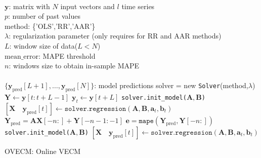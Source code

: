 \begin{algorithm}[ht]
\begin{algorithmic}[1]
\REQUIRE $\,$ \\
$\mathbf{y}$: matrix with $N$ input vectors and $l$ time series\\
$p$: number of past values \\
method: \{'OLS','RR','AAR'\} \\
$\lambda$: regularization parameter (only requires for RR and AAR methods) \\
$L$: window size of data($L<N$) \\
$\text{mean\_error}$: MAPE threshold \\
$n$: windows size to obtain in-sample MAPE \\
\ENSURE  $\,$ \\
$\{\mathbf{y}_{\text{pred}}[L+1],\dots, \mathbf{y}_{\text{pred}}[N]\}$: model predictions 
\STATE solver = new \texttt{Solver}(method,$\lambda$) \\
    \STATE $\mathbf{Y} \gets \mathbf{y}[t:t+L-1]$
    \STATE $\mathbf{y}_t \gets \mathbf{y}[t+L]$
        \STATE \texttt{solver.init\_model($\mathbf{A},\mathbf{B}$)} 
    \ENDIF
    \STATE $[\mathbf{X} \quad \mathbf{y}_{\text{pred}}[t]] \gets \texttt{solver.regression}
    (\mathbf{A},\mathbf{B},\mathbf{a}_t,\mathbf{b}_t)$
    \STATE $\mathbf{Y}_{\text{pred}} = \mathbf{AX}[-n:]+\mathbf{Y}[-n-1:-1]$
    \STATE $\mathbf{e} = \texttt{mape}(\mathbf{Y}_{\text{pred}},\mathbf{Y}[-n:])$
        \STATE \texttt{solver.init\_model($\mathbf{A},\mathbf{B}$)} 
        \STATE $[\mathbf{X} \quad \mathbf{y}_{\text{pred}}[t]] \gets \texttt{solver.regression}
        (\mathbf{A},\mathbf{B},\mathbf{a}_t,\mathbf{b}_t)$
    \ENDIF
{}
\ENDFOR
\end{algorithmic}
\caption{OVECM: Online VECM}
\label{alg:proposal}
\end{algorithm}


